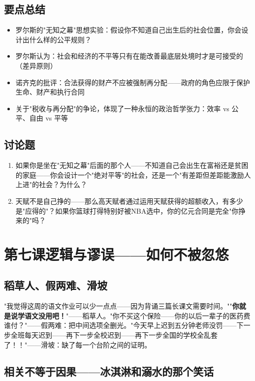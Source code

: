 \documentclass[a4paper,12pt]{ctexart}
\begin{document}
\subsection*{要点总结}
\begin{itemize}
  \item 罗尔斯的"无知之幕"思想实验：假设你不知道自己出生后的社会位置，你会设计出什么样的公平规则？
  \item 罗尔斯认为：社会和经济的不平等只有在能改善最底层处境时才是可接受的（差异原则）
  \item 诺齐克的批评：合法获得的财产不应被强制再分配——政府的角色应限于保护生命、财产和执行合同
  \item 关于"税收与再分配"的争论，体现了一种永恒的政治哲学张力：效率 vs 公平、自由 vs 平等
\end{itemize}

\subsection*{讨论题}
\begin{enumerate}
  \item 如果你是坐在"无知之幕"后面的那个人——不知道自己会出生在富裕还是贫困的家庭——你会设计一个"绝对平等"的社会，还是一个"有差距但差距能激励人上进"的社会？为什么？
  \item 天赋不是自己挣的——那么高天赋者通过运用天赋获得的超额收入，有多少是"应得的"？如果你篮球打得特别好被NBA选中，你的亿元合同是完全"你挣来的"吗？
\end{enumerate}

\newpage
\section{\textcolor{orange!80!black}{第七课\quad 逻辑与谬误——如何不被忽悠}}

\subsection*{稻草人、假两难、滑坡}

"我觉得这周的语文作业可以少一点点——因为背诵三篇长课文需要时间。""\textbf{你就是说学语文没用吧！}"——稻草人。"你不买这个保险——你的以后一辈子的医药费谁付？"——假两难：把中间选项全删光。"今天早上迟到五分钟老师没罚——下一步全班每天迟到——再下一步全校迟到——再下一步全国的学校全乱套了！！"——滑坡：缺了每一个台阶之间的证明。

\subsection*{相关不等于因果——冰淇淋和溺水的那个笑话}
\end{document}

